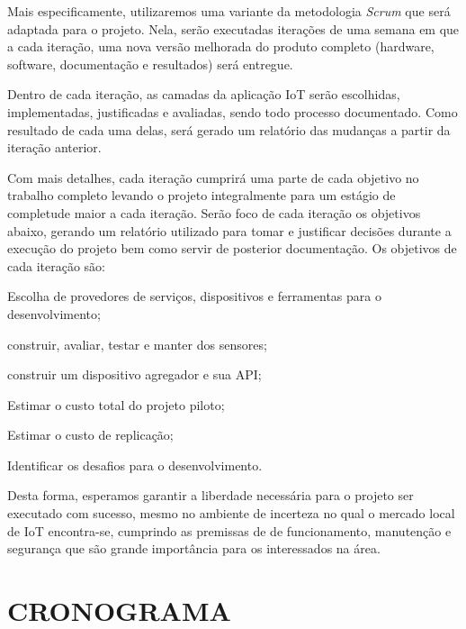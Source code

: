 \documentclass[
	12pt,				%
	openright,			%
	oneside,			%
	a4paper,			%
	chapter=TITLE,		%
	english,			%
	french,				%
	spanish,			%
	brazil				%
	]{abntex2}
\begin{document}
{Mais especificamente, utilizaremos uma variante da metodologia \textit{Scrum}
\cite{James2016} que será adaptada para o projeto. Nela, serão executadas
iterações de uma semana em que a cada iteração, uma nova versão melhorada do
produto completo (hardware, software, documentação e resultados) será entregue.

Dentro de cada iteração, as camadas da aplicação IoT serão escolhidas,
implementadas, justificadas e avaliadas, sendo todo processo documentado. Como
resultado de cada uma delas, será gerado um relatório das mudanças a partir da
iteração anterior.

Com mais detalhes, cada iteração cumprirá uma parte de cada objetivo no trabalho
completo levando o projeto integralmente para um estágio de completude maior a
cada iteração. Serão foco de cada iteração os objetivos abaixo, gerando um
relatório utilizado para tomar e justificar decisões durante a execução do
projeto bem como servir de posterior documentação. Os objetivos de cada iteração
são:

\begin{alineas}

	\item Escolha de provedores de serviços, dispositivos e ferramentas para o
desenvolvimento;

	\item construir, avaliar, testar e manter dos sensores;

	\item construir um dispositivo agregador e sua API;

	\item Estimar o custo total do projeto piloto;

	\item Estimar o custo de replicação;

	\item Identificar os desafios para o desenvolvimento.

\end{alineas}

Desta forma, esperamos garantir a liberdade necessária para o projeto ser
executado com sucesso, mesmo no ambiente de incerteza no qual o mercado local de
IoT encontra-se, cumprindo as premissas de de funcionamento, manutenção e
segurança que são grande importância para os interessados na área.


\chapter{CRONOGRAMA}
\label{chap:CRONOGRAMA}

}
\end{document}
